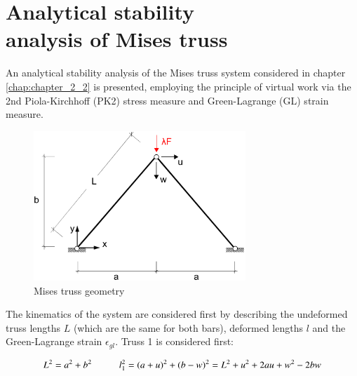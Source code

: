 
\chapter[Analytical stability analysis of Mises truss]{Analytical stability\\ analysis of Mises truss}
\label{app:Analytical stability analysis of Mises truss}
\renewcommand{\Thema}{Analytical stability analysis of Mises truss}

An analytical stability analysis of the Mises truss system considered in chapter \ref{chap:chapter_2_2} is presented, employing the principle of virtual work via the 2nd Piola-Kirchhoff (PK2) stress measure and Green-Lagrange (GL) strain measure.

\begin{figure}[H]
	\centering
	\def\svgwidth{\columnwidth}
	\includegraphics[width=8cm]{images/mises_truss_def.png}
	\caption{Mises truss geometry}
	\label{pic:app0}
\end{figure}

The kinematics of the system are considered first by describing the undeformed truss lengths $L$ (which are the same for both bars), deformed lengths $l$ and the Green-Lagrange strain $\epsilon_{gl}$. Truss 1 is considered first:

\begin{equation} 
L^2 = a^2 + b^2
\hspace{10mm}
l_1^2 = (a+u)^2 + (b-w)^2 = L^2 + u^2 + 2au +w^2 -2bw
\label{eqapp0_1}
\end{equation}

